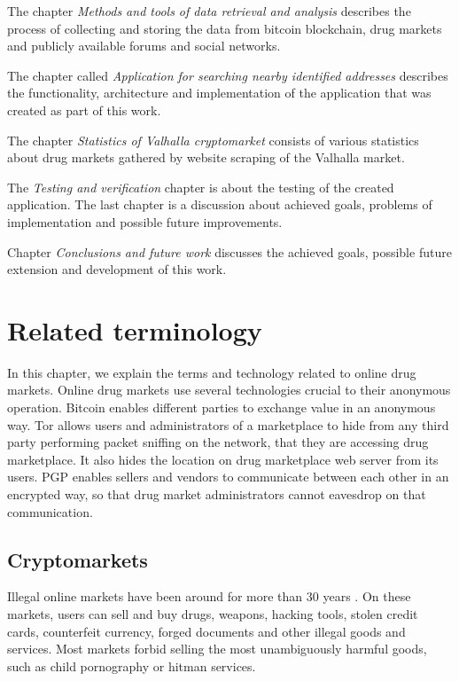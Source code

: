 \documentclass[
  digital, %
  table,   %
  lof,     %
  lot,     %
  oneside
]{fithesis3}
\begin{document}
The chapter \emph{Methods and tools of data retrieval and analysis} describes the process of collecting
and storing the data from bitcoin blockchain, drug markets and publicly available forums and social networks. 

The chapter called 
\emph{Application for searching nearby identified addresses}
describes the functionality, architecture and implementation of the application that was created as part of this work.

The chapter \emph{Statistics of Valhalla cryptomarket} consists of various statistics about
drug markets gathered by website scraping of the Valhalla market.

The \emph{Testing and verification} chapter is about the testing of the created application.
The last chapter is a discussion about achieved goals, problems of implementation and possible future improvements.

Chapter \emph{Conclusions and future work} discusses the achieved goals, possible future extension and development
of this work.


\chapter{Related terminology}

In this chapter, we explain the terms and technology related to online drug markets.
Online drug markets use several technologies crucial to their anonymous operation.
Bitcoin enables different parties to exchange value in an anonymous way.
Tor allows users and administrators of a marketplace to hide from any third party performing packet sniffing on the network,
that they are accessing drug marketplace. It also hides the location on drug marketplace web server from its users.
PGP enables sellers and vendors to communicate between each other in an encrypted way,
so that drug market administrators cannot eavesdrop on that communication.

\section{Cryptomarkets}

Illegal online markets have been around for more than 30 years \parencite{motoyama2011analysis}.
On these markets, users can sell and buy drugs, weapons, hacking tools, stolen credit cards,
counterfeit currency, forged documents and other illegal goods and services.
Most markets forbid selling the most unambiguously harmful goods, such as child pornography or hitman services.
\end{document}
